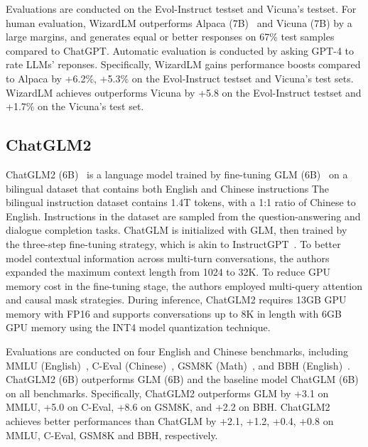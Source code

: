 \documentclass[11pt]{article}
\begin{document}
Evaluations are conducted on the Evol-Instruct testset and Vicuna’s testset. For human evaluation, WizardLM outperforms Alpaca (7B)~\citep{taori2023alpaca} and Vicuna (7B) by a large margins, and generates equal or better responses on 67\% test samples compared to ChatGPT.  
Automatic evaluation is conducted by asking GPT-4 to rate LLMs' reponses. 
Specifically, WizardLM gains performance boosts compared to Alpaca by +6.2\%, +5.3\% on the Evol-Instruct testset and Vicuna’s test sets. WizardLM achieves outperforms Vicuna by +5.8 on the Evol-Instruct testset and +1.7\% on the Vicuna’s test set. 


\subsection{ChatGLM2}
ChatGLM2 (6B)~\citep{du2022glm} is a language model trained by fine-tuning GLM (6B)~\citep{du2022glm} on  a  bilingual dataset that contains both English and Chinese instructions The bilingual instruction dataset contains 1.4T tokens, with a 1:1 ratio of Chinese to English. Instructions in the dataset are sampled from the question-answering and dialogue completion tasks.
ChatGLM is initialized with GLM, then trained by the three-step fine-tuning strategy, which is akin to InstructGPT~\citep{ouyang2022training}. To better model contextual information across multi-turn conversations, the authors expanded the maximum context length from 1024 to 32K. To reduce GPU memory cost in the fine-tuning stage, the authors employed multi-query attention and causal mask  strategies. During inference, ChatGLM2 requires 13GB GPU memory with FP16 and supports conversations up to 8K in length with 6GB GPU memory using the INT4 model quantization technique. 

Evaluations are conducted on four English and Chinese benchmarks, including MMLU (English)~\citep{Hendrycks2020MeasuringMM}, C-Eval (Chinese)~\citep{huang2023ceval}, GSM8K (Math)~\citep{cobbe2021training}, and BBH (English)~\citep{Suzgun2022ChallengingBT}. ChatGLM2 (6B) outperforms GLM (6B) and the baseline model ChatGLM (6B) on all benchmarks. Specifically, ChatGLM2 outperforms GLM by +3.1 on MMLU, +5.0 on C-Eval, +8.6 on GSM8K, and +2.2 on BBH. ChatGLM2 achieves better performances than ChatGLM by +2.1, +1.2, +0.4, +0.8 on MMLU, C-Eval, GSM8K and BBH, respectively. 
\end{document}
